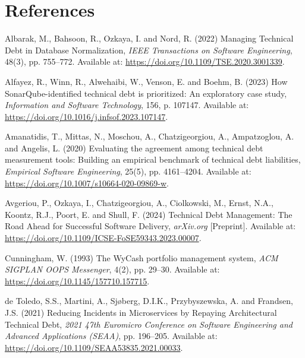 \documentclass[
  11pt,
  letterpaper,
  11pt,
  oneside,
  english,
  onehalfspacing,
  headsepline]{MastersDoctoralThesis}
\newlength{\cslhangindent}
\newenvironment{CSLReferences}[2] %
 {\begin{list}{}{%
  \setlength{\itemindent}{0pt}
  \setlength{\leftmargin}{0pt}
  \setlength{\parsep}{0pt}
  \ifodd #1
   \setlength{\leftmargin}{\cslhangindent}
   \setlength{\itemindent}{-1\cslhangindent}
  \fi
  \setlength{\itemsep}{#2\baselineskip}}}
 {\end{list}}
\begin{document}

\chapter*{References}\label{references}


\label{refs}
\begin{CSLReferences}{0}{1}
Albarak, M., Bahsoon, R., Ozkaya, I. and Nord, R. (2022)
\textquotesingle Managing {Technical Debt} in {Database
Normalization}\textquotesingle, \emph{IEEE Transactions on Software
Engineering}, 48(3), pp. 755--772. Available at:
\url{https://doi.org/10.1109/TSE.2020.3001339}.

Alfayez, R., Winn, R., Alwehaibi, W., Venson, E. and Boehm, B. (2023)
\textquotesingle How {SonarQube-identified} technical debt is
prioritized: {An} exploratory case study\textquotesingle,
\emph{Information and Software Technology}, 156, p. 107147. Available
at: \url{https://doi.org/10.1016/j.infsof.2023.107147}.

Amanatidis, T., Mittas, N., Moschou, A., Chatzigeorgiou, A.,
Ampatzoglou, A. and Angelis, L. (2020) \textquotesingle Evaluating the
agreement among technical debt measurement tools: Building an empirical
benchmark of technical debt liabilities\textquotesingle, \emph{Empirical
Software Engineering}, 25(5), pp. 4161--4204. Available at:
\url{https://doi.org/10.1007/s10664-020-09869-w}.

Avgeriou, P., Ozkaya, I., Chatzigeorgiou, A., Ciolkowski, M., Ernst,
N.A., Koontz, R.J., Poort, E. and Shull, F. (2024)
\textquotesingle Technical {Debt Management}: {The Road Ahead} for
{Successful Software Delivery}\textquotesingle, \emph{arXiv.org}
{[}Preprint{]}. Available at:
\url{https://doi.org/10.1109/ICSE-FoSE59343.2023.00007}.

Cunningham, W. (1993) \textquotesingle The {WyCash} portfolio management
system\textquotesingle, \emph{ACM SIGPLAN OOPS Messenger}, 4(2), pp.
29--30. Available at: \url{https://doi.org/10.1145/157710.157715}.

de Toledo, S.S., Martini, A., Sjøberg, D.I.K., Przybyszewska, A. and
Frandsen, J.S. (2021) \textquotesingle Reducing {Incidents} in
{Microservices} by {Repaying Architectural Technical
Debt}\textquotesingle, \emph{2021 47th {Euromicro Conference} on
{Software Engineering} and {Advanced Applications} ({SEAA})}, pp.
196--205. Available at:
\url{https://doi.org/10.1109/SEAA53835.2021.00033}.


\end{CSLReferences}
\end{document}
